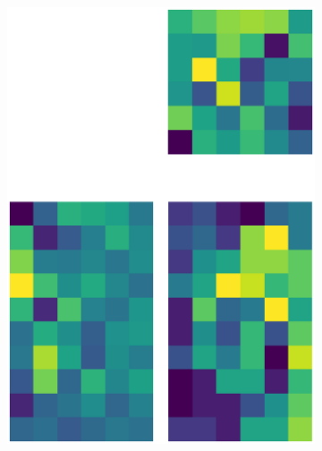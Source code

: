 \documentclass[10pt,twocolumn]{article}
\begin{document}
\begin{figure}[H]
\begin{subfigure}[t]{.15\textwidth}
\includegraphics[scale=.2]{DWGs/semi-structured-matrix-reconstruction-PCs-6.eps}
\caption{ }
\end{subfigure}
\begin{subfigure}[t]{.15\textwidth}
\centering

\end{subfigure}
\end{figure}
\end{document}
